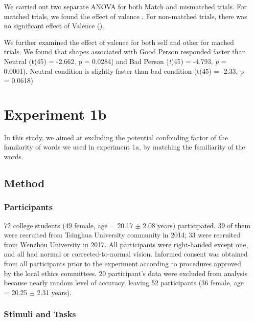 \documentclass[man]{apa6}
\begin{document}
We carried out two separate ANOVA for both Match and mismatched trials. For matched trials, we found the effect of valence . For non-matched trials, there was no significant effect of Valence ().

We further examined the effect of valence for both self and other for mached trials. We found that shapes associated with Good Person responded faster than Neutral (t(45) = -2.662, p = 0.0284) and Bad Person (\emph{t}(45) = -4.793, \emph{p} = 0.0001). Neutral condition is slightly faster than bad condition (t(45) = -2.33, p = 0.0618)

\hypertarget{experiment-1b}{%
\section{Experiment 1b}\label{experiment-1b}}

In this study, we aimed at excluding the potential confouding factor of the familarity of words we used in experiment 1a, by matching the familiarity of the words.

\hypertarget{method}{%
\subsection{Method}\label{method}}

\hypertarget{participants-1}{%
\subsubsection{Participants}\label{participants-1}}

72 college students (49 female, age = 20.17 \(\pm\) 2.08 years) participated. 39 of them were recruited from Tsinghua University community in 2014; 33 were recruited from Wenzhou University in 2017. All participants were right-handed except one, and all had normal or corrected-to-normal vision. Informed consent was obtained from all participants prior to the experiment according to procedures approved by the local ethics committees. 20 participant's data were excluded from analysis because nearly random level of accuracy, leaving 52 participants (36 female, age = 20.25 \(\pm\) 2.31 years).

\hypertarget{stimuli-and-tasks-1}{%
\subsubsection{Stimuli and Tasks}\label{stimuli-and-tasks-1}}
\end{document}
